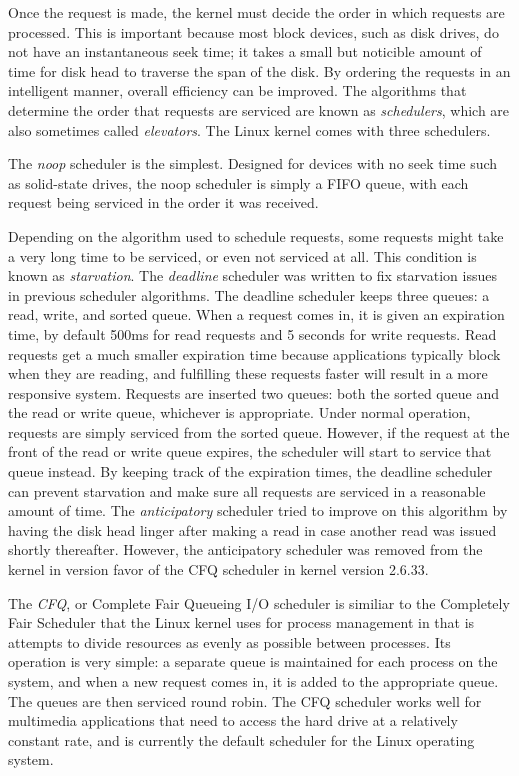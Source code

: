 \documentclass[10pt,journal,draftclsnofoot,onecolumn]{IEEEtran}
\begin{document}


Once the request is made, the kernel must 
decide the order in which requests are processed. This is important because
most block devices, such as disk drives, do not have an instantaneous
seek time; it takes a small but noticible amount of time for disk head
to traverse the span of the disk. By ordering the requests in an intelligent
manner, overall efficiency can be improved. The algorithms that determine
the order that requests are serviced are known as \textit{schedulers},
which are also sometimes called \textit{elevators}.
The Linux kernel comes with three schedulers.

The \textit{noop} scheduler is the simplest. Designed for devices with
no seek time such as solid-state drives, the noop scheduler is simply
a FIFO queue, with each request being serviced in the order it was
received.

Depending on the algorithm used to schedule requests, some requests might
take a very long time to be serviced, or even not serviced at all. This
condition is known as \textit{starvation}. The \textit{deadline} scheduler
was written to fix starvation issues in previous scheduler algorithms. The
deadline scheduler keeps three queues: a read, write, and sorted queue.
When a request comes in, it is given an expiration time,
by default 500ms for read requests and 5 seconds for write requests. Read
requests get a much smaller expiration time because applications typically
block when they are reading, and fulfilling these requests faster will
result in a more responsive system.
Requests are inserted two queues: both the sorted queue and the read or write
queue, whichever is appropriate. Under normal operation, requests are simply
serviced from the sorted queue. However, if the request at the front of the
read or write queue expires, the scheduler will start to service that
queue instead. By keeping track of the expiration times, the deadline
scheduler can prevent starvation and make sure all requests are serviced in
a reasonable amount of time. The 
\textit{anticipatory} scheduler tried to improve
on this algorithm by having the disk head linger after making a read in
case another read was issued shortly thereafter. However, the anticipatory
scheduler was removed from the kernel in version  favor of the
CFQ scheduler in kernel version 2.6.33.

The \textit{CFQ}, or Complete Fair Queueing I/O scheduler is similiar to the
Completely Fair Scheduler that the Linux kernel uses for process management
in that is attempts to divide resources as 
evenly as possible between processes. Its operation is very simple: a
separate queue is maintained for each process on the system, and when
a new request comes in, it is added to the appropriate queue. The queues
are then serviced round robin. The CFQ scheduler works well for
multimedia applications that need to access the hard drive at a relatively
constant rate, and is currently the default scheduler for the Linux
operating system\cite{linux-kernel-dev}.
\end{document}
